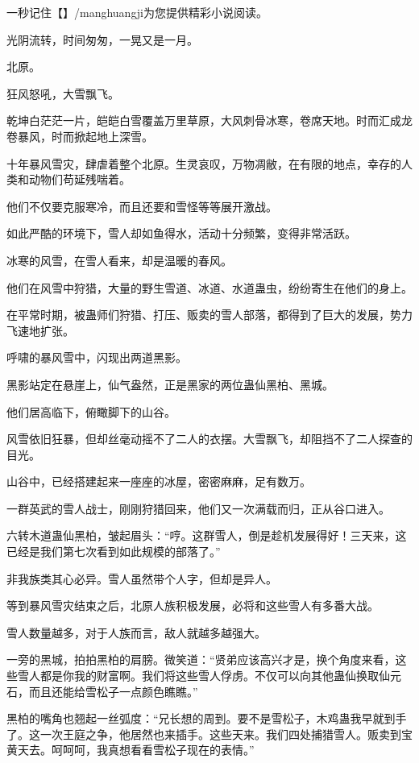 
\begin{this_body}

一秒记住【】/manghuangji为您提供精彩小说阅读。

光阴流转，时间匆匆，一晃又是一月。

北原。

狂风怒吼，大雪飘飞。

乾坤白茫茫一片，皑皑白雪覆盖万里草原，大风刺骨冰寒，卷席天地。时而汇成龙卷暴风，时而掀起地上深雪。

十年暴风雪灾，肆虐着整个北原。生灵哀叹，万物凋敝，在有限的地点，幸存的人类和动物们苟延残喘着。

他们不仅要克服寒冷，而且还要和雪怪等等展开激战。

如此严酷的环境下，雪人却如鱼得水，活动十分频繁，变得非常活跃。

冰寒的风雪，在雪人看来，却是温暖的春风。

他们在风雪中狩猎，大量的野生雪道、冰道、水道蛊虫，纷纷寄生在他们的身上。

在平常时期，被蛊师们狩猎、打压、贩卖的雪人部落，都得到了巨大的发展，势力飞速地扩张。

呼啸的暴风雪中，闪现出两道黑影。

黑影站定在悬崖上，仙气盎然，正是黑家的两位蛊仙黑柏、黑城。

他们居高临下，俯瞰脚下的山谷。

风雪依旧狂暴，但却丝毫动摇不了二人的衣摆。大雪飘飞，却阻挡不了二人探查的目光。

山谷中，已经搭建起来一座座的冰屋，密密麻麻，足有数万。

一群英武的雪人战士，刚刚狩猎回来，他们又一次满载而归，正从谷口进入。

六转木道蛊仙黑柏，皱起眉头：“哼。这群雪人，倒是趁机发展得好！三天来，这已经是我们第七次看到如此规模的部落了。”

非我族类其心必异。雪人虽然带个人字，但却是异人。

等到暴风雪灾结束之后，北原人族积极发展，必将和这些雪人有多番大战。

雪人数量越多，对于人族而言，敌人就越多越强大。

一旁的黑城，拍拍黑柏的肩膀。微笑道：“贤弟应该高兴才是，换个角度来看，这些雪人都是你我的财富啊。我们将这些雪人俘虏。不仅可以向其他蛊仙换取仙元石，而且还能给雪松子一点颜色瞧瞧。”

黑柏的嘴角也翘起一丝弧度：“兄长想的周到。要不是雪松子，木鸡蛊我早就到手了。这一次王庭之争，他居然也来插手。这些天来。我们四处捕猎雪人。贩卖到宝黄天去。呵呵呵，我真想看看雪松子现在的表情。”


\end{this_body}
